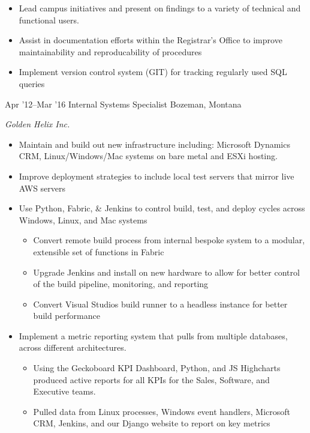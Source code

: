 \documentclass[]{two-column-stats} %
\begin{document}
\begin{entrylist}
{\begin{itemize}
\begin{itemize}
  \item Improve maintenance of student programs and majors in Banner \& DegreeWorks so that we have accurate reporting to governing bodies and students
  \item Migrate reports from Microsoft Access to bespoke Python \& \LaTeX pipelines, or Argos \& Tableau to improve maintainability and visual appeal
\end{itemize}
\item Lead campus initiatives and present on findings to a variety of technical and functional users.
\item Assist in documentation efforts within the Registrar's Office to improve maintainability and reproducability of procedures
\item Implement version control system (GIT) for tracking regularly used SQL queries
\end{itemize}
}
\entry
{Apr '12--Mar '16}
{Internal Systems Specialist}
{Bozeman, Montana}
{\emph{Golden Helix Inc.}
\begin{itemize}
\item Maintain and build out new infrastructure including: Microsoft Dynamics CRM, Linux/Windows/Mac systems on bare metal and ESXi hosting.
\item Improve deployment strategies to include local test servers that mirror live AWS servers
\item Use Python, Fabric, \& Jenkins to control build, test, and deploy cycles across Windows, Linux, and Mac systems
\begin{itemize}
  \item Convert remote build process from internal bespoke system to a modular, extensible set of functions in Fabric
  \item Upgrade Jenkins and install on new hardware to allow for better control of the build pipeline, monitoring, and reporting
  \item Convert Visual Studios build runner to a headless instance for better build performance
\end{itemize}
\item Implement a metric reporting system that pulls from multiple databases, across different architectures.
\begin{itemize}
  \item Using the Geckoboard KPI Dashboard, Python, and JS Highcharts produced active reports for all KPIs for the Sales, Software, and Executive teams.
  \item Pulled data from Linux processes, Windows event handlers, Microsoft CRM, Jenkins, and our Django website to report on key metrics

\end{itemize}
\end{itemize}}
\end{entrylist}
\end{document}

